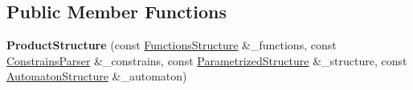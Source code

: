 \subsection*{Public Member Functions}
\begin{DoxyCompactItemize}
\item 
\hypertarget{class_product_structure_a2257d41dabed7a863355f7423f748ae7}{{\bfseries Product\-Structure} (const \hyperlink{class_functions_structure}{Functions\-Structure} \&\-\_\-functions, const \hyperlink{class_constrains_parser}{Constrains\-Parser} \&\-\_\-constrains, const \hyperlink{class_parametrized_structure}{Parametrized\-Structure} \&\-\_\-structure, const \hyperlink{class_automaton_structure}{Automaton\-Structure} \&\-\_\-automaton)}\label{class_product_structure_a2257d41dabed7a863355f7423f748ae7}


\end{DoxyCompactItemize}
